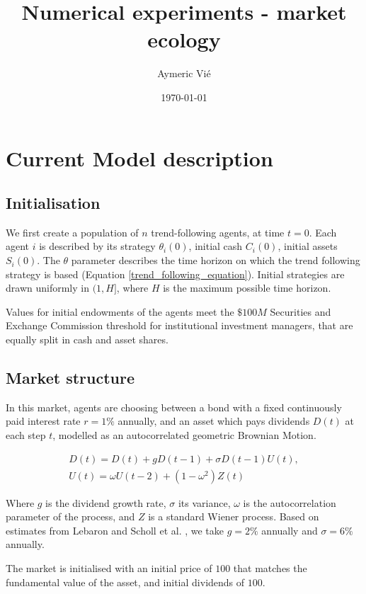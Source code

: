 \documentclass{article}
\title{Numerical experiments - market ecology}
\author{Aymeric Vi\'{e}}
\date{\today}
\begin{document}
\maketitle

\tableofcontents

\clearpage

\section{Current Model description}

\subsection{Initialisation}

We first create a population of $n$ trend-following agents, at time $t=0$. Each agent $i$ is described by its strategy $\theta_i(0)$, initial cash $C_i(0)$, initial assets $S_i(0)$. The $\theta$ parameter describes the time horizon on which the trend following strategy is based (Equation \ref{trend_following_equation}). Initial strategies are drawn uniformly in $(1,H]$, where $H$ is the maximum possible time horizon. \par
Values for initial endowments of the agents meet the $\$100M$ Securities and Exchange Commission threshold for institutional investment managers, that are equally split in cash and asset shares. 

\subsection{Market structure}

In this market, agents are choosing between a bond with a fixed continuously paid interest rate $r = 1\%$ annually, and an asset which pays dividends $D(t)$ at each step $t$, modelled as an autocorrelated geometric Brownian Motion.

\begin{equation}
    \label{dividend_equation}
    \begin{array}{l}
{D}(t)={D}(t)+g {D}(t-1)+\sigma {D}(t-1) {U}(t), \\
{U}(t)=\omega U(t-2)+\left(1-\omega^{2}\right){Z}(t)
\end{array}
\end{equation}

Where $g$ is the dividend growth rate, $\sigma$ its variance, $\omega$ is the autocorrelation parameter of the process, and $Z$ is a standard Wiener process. Based on estimates from Lebaron \cite{lebaron2001empirical} and Scholl et al. \cite{scholl2020market}, we take $g=2\%$ annually and $\sigma = 6\%$ annually. \par
The market is initialised with an initial price of $100$ that matches the fundamental value of the asset, and initial dividends of $100$. 
\end{document}
